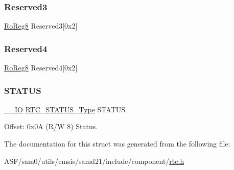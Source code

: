 \mbox{\label{struct_rtc_mode1_ad07c4ef2ff7a794403c53387495e8d6d}} 
\subsubsection{\texorpdfstring{Reserved3}{Reserved3}}
{\footnotesize\ttfamily \mbox{\hyperlink{group___s_a_m_d21_e15_a__definitions_ga0d957f1433aaf5d70e4dc2b68288442d}{Ro\+Reg8}} Reserved3\mbox{[}0x2\mbox{]}}

\mbox{\label{struct_rtc_mode1_aec3221203f6f367a8473128fc2f5429e}} 
\subsubsection{\texorpdfstring{Reserved4}{Reserved4}}
{\footnotesize\ttfamily \mbox{\hyperlink{group___s_a_m_d21_e15_a__definitions_ga0d957f1433aaf5d70e4dc2b68288442d}{Ro\+Reg8}} Reserved4\mbox{[}0x2\mbox{]}}

\mbox{\label{struct_rtc_mode1_a18fb82dd8352b8ac5b64e276ab0b5268}} 
\subsubsection{\texorpdfstring{STATUS}{STATUS}}
{\footnotesize\ttfamily \mbox{\hyperlink{core__cm0plus_8h_aec43007d9998a0a0e01faede4133d6be}{\+\_\+\+\_\+\+IO}} \mbox{\hyperlink{union_r_t_c___s_t_a_t_u_s___type}{R\+T\+C\+\_\+\+S\+T\+A\+T\+U\+S\+\_\+\+Type}} S\+T\+A\+T\+US}



Offset\+: 0x0A (R/W 8) Status. 



The documentation for this struct was generated from the following file\+:\begin{DoxyCompactItemize}
\item 
A\+S\+F/sam0/utils/cmsis/samd21/include/component/\mbox{\hyperlink{component_2rtc_8h}{rtc.\+h}}\end{DoxyCompactItemize}
